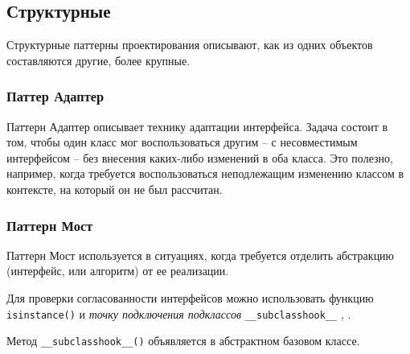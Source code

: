 \documentclass[%
	11pt,
	a4paper,
	utf8,
		]{article}
\begin{document}
\subsection{Структурные}

Структурные паттерны проектирования описывают, как из одних объектов составляются другие, более крупные.

\subsubsection{Паттер Адаптер}

Паттерн Адаптер описывает технику адаптации интерфейса. Задача состоит в том, чтобы один класс мог воспользоваться другим -- с несовместимым интерфейсом -- без внесения каких-либо изменений в оба класса. Это полезно, например, когда требуется воспользоваться неподлежащим изменению классом в контексте, на который он не был рассчитан.

\subsubsection{Паттерн Мост}

Паттерн Мост используется в ситуациях, когда требуется отделить абстракцию (интерфейс, или алгоритм) от ее реализации.

Для проверки согласованности интерфейсов можно использовать функцию \verb*|isinstance()| и \emph{точку подключения подклассов} \verb*|__subclasshook__| \cite[]{wilkes:adv_python}, \cite[]{summerfield:python_practice}.

Метод \verb*|__subclasshook__()| объявляется в абстрактном базовом классе. 
\end{document}
